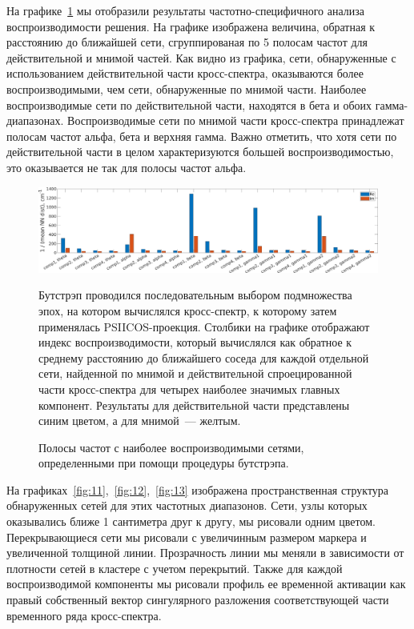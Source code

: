 


На графике~\ref{fig:10} мы отобразили результаты частотно-специфичного
анализа воспроизводимости решения. На графике изображена величина, обратная к
расстоянию до ближайшей сети, сгруппированая по 5 полосам частот для
действительной и мнимой частей. Как видно из графика, сети, обнаруженные с
использованием действительной части кросс-спектра, оказываются более
воспроизводимыми, чем сети, обнаруженные по мнимой части. Наиболее воспроизводимые
сети по действительной части, находятся в бета и обоих гамма-диапазонах.
Воспроизводимые сети по мнимой части кросс-спектра принадлежат полосам частот
альфа, бета и верхняя гамма. Важно отметить, что хотя сети по действительной части
в целом характеризуются большей воспроизводимостью, это оказывается не так для
полосы частот альфа.

\begin{figure}[h!tpb]
 \includegraphics[width=1\textwidth]{../images/psiicos_paper/Figure10_hr.jpg}
 \caption{Полосы частот с наиболее воспроизводимыми сетями, определенными при помощи
 процедуры бутстрэпа.}\label{fig:10}
 Бутстрэп проводился последовательным выбором подмножества эпох, на котором
 вычислялся кросс-спектр, к которому затем применялась PSIICOS-проекция.
 Столбики на графике отображают индекс воспроизводимости, который вычислялся
 как обратное к среднему расстоянию до ближайшего соседа для каждой отдельной
 сети, найденной по мнимой и действительной спроецированной части кросс-спектра для четырех
 наиболее значимых главных компонент. Результаты для действительной части представлены
 синим цветом, а для мнимой~--- желтым.
 \end{figure} %

 На графиках~\ref{fig:11},~\ref{fig:12},~\ref{fig:13} изображена пространственная
структура обнаруженных сетей для этих частотных диапазонов. Сети, узлы которых
оказывались ближе 1 сантиметра друг к другу, мы рисовали одним цветом. Перекрывающиеся сети
мы рисовали с увеличинным размером маркера и увеличенной толщиной линии. Прозрачность
линии мы меняли в зависимости от плотности сетей в кластере с учетом перекрытий.
Также для каждой воспроизводимой компоненты мы рисовали профиль ее временной активации
как правый собственный вектор сингулярного разложения соответствующей части временного
ряда кросс-спектра.

